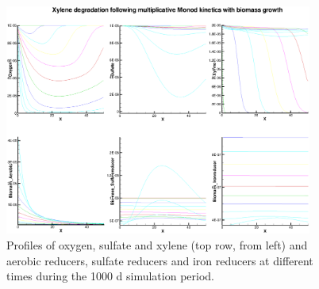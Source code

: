 \begin{figure}
\centering
\includegraphics[width=0.9\textwidth]{PART_III/HC/profiles_xylene_degradation.eps}
\caption{Profiles of oxygen, sulfate and xylene (top row, from left) and  aerobic reducers, sulfate reducers and iron reducers at different times during the 1000 d simulation period.}
\label{profiles_xylene_degradation}
\end{figure}
